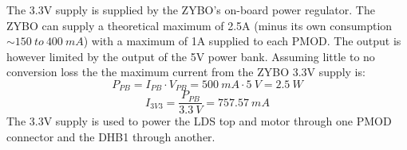 \documentclass[Main]{subfiles}
\begin{document}
		The 3.3V supply is supplied by the ZYBO's on-board power regulator.
		The ZYBO can supply a theoretical maximum of 2.5A (minus its own consumption $\sim150\ to\ 400\ mA$) with a maximum of 1A supplied to each PMOD.
		The output is however limited by the output of the 5V power bank.
		Assuming little to no conversion loss the the maximum current from the ZYBO 3.3V supply is:
		\begin{equation}
			P_{PB} = I_{PB} \cdot V_{PB} = 
			500\ mA \cdot 5\ V =
			2.5\ W
		\end{equation}
		\begin{equation}
			I_{3V3} = 
			\frac{P_{PB}}{3.3\ V} =
			757.57\ mA
		\end{equation}
		The 3.3V supply is used to power the LDS top and motor through one PMOD connector and the DHB1 through another.


\end{document}
